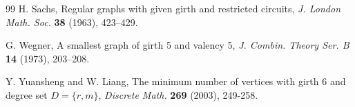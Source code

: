 \documentclass[a4paper,11pt]{article}
\begin{document}
\begin{thebibliography}{99}
H. Sachs, Regular graphs with given girth and restricted circuits, \emph{J. London Math.
Soc.} {\bf 38} (1963), 423--429.



G. Wegner, A smallest graph of girth 5 and valency 5, \emph{J. Combin. Theory Ser. B} {\bf 14}
(1973), 203--208.


Y. Yuansheng and W. Liang,
The minimum number of vertices with girth $6$ and degree set $D=\{r,m\}$,
{\em Discrete Math.} {\bf  269} (2003), 249-258.





















\end{thebibliography}
\end{document}
